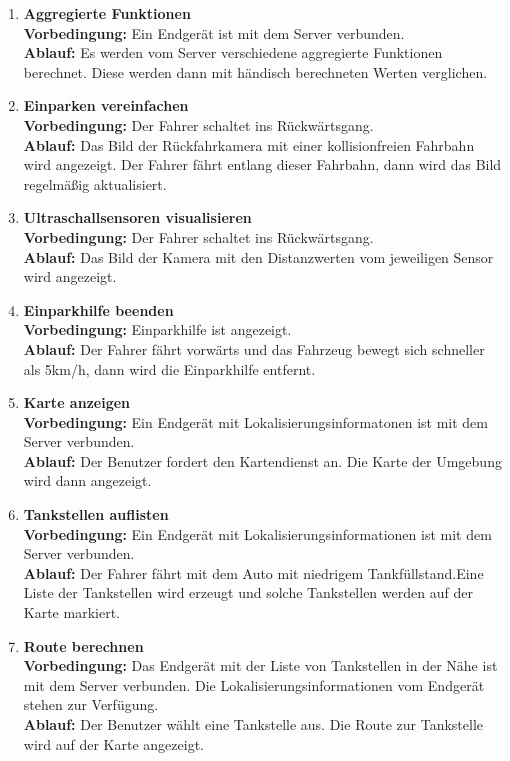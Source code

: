 \documentclass[pflichtenheft.tex]{subfiles}
\begin{document}
\begin{enumerate}
\item{\textbf{Aggregierte Funktionen}} \\
\textbf{Vorbedingung: } Ein Endgerät ist mit dem Server verbunden. \\ 
\textbf{Ablauf: } Es werden vom Server verschiedene aggregierte Funktionen berechnet. Diese werden dann mit händisch berechneten Werten verglichen.

\item{\textbf{Einparken vereinfachen}} \\
\textbf{Vorbedingung: } Der Fahrer schaltet ins Rückwärtsgang. \\
\textbf{Ablauf: } Das Bild der Rückfahrkamera mit einer kollisionfreien
Fahrbahn wird angezeigt. Der Fahrer fährt entlang dieser Fahrbahn, dann wird das
Bild regelmäßig aktualisiert.

\item{\textbf{Ultraschallsensoren visualisieren}} \\
\textbf{Vorbedingung: } Der Fahrer schaltet ins Rückwärtsgang. \\
\textbf{Ablauf: } Das Bild der Kamera mit den Distanzwerten vom jeweiligen
Sensor wird angezeigt.

\item{\textbf{Einparkhilfe beenden}} \\
\textbf{Vorbedingung: } Einparkhilfe ist angezeigt. \\
\textbf{Ablauf: } Der Fahrer fährt vorwärts und das Fahrzeug bewegt sich
schneller als 5km/h, dann wird die Einparkhilfe entfernt.


\item{\textbf{Karte anzeigen}} \\
\textbf{Vorbedingung: } Ein Endgerät mit Lokalisierungsinformatonen ist mit dem
Server verbunden.\\
\textbf{Ablauf: } Der Benutzer fordert den Kartendienst an. Die Karte der
Umgebung wird dann angezeigt.

\item{\textbf{Tankstellen auflisten}} \\
\textbf{Vorbedingung: } Ein Endgerät mit Lokalisierungsinformationen ist mit dem
Server verbunden.\\
\textbf{Ablauf: } Der Fahrer fährt mit dem Auto mit niedrigem Tankfüllstand.Eine
Liste der Tankstellen wird erzeugt und solche Tankstellen werden auf der
Karte markiert.

\item{\textbf{Route berechnen}} \\
\textbf{Vorbedingung: } Das Endgerät mit der Liste von Tankstellen in der Nähe
ist mit dem Server verbunden. Die Lokalisierungsinformationen vom Endgerät
stehen zur Verfügung.\\
\textbf{Ablauf: } Der Benutzer wählt eine Tankstelle aus. Die Route zur
Tankstelle wird auf der Karte angezeigt.


\end{enumerate}
\end{document}
